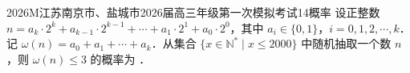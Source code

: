 
\begin{problem}{2026}{M}{江苏南京市、盐城市2026届高三年级第一次模拟考试}{14}{概率}
设正整数 $n=a_k\cdot2^k+a_{k-1}\cdot2^{k-1}+\cdots+a_1\cdot2^1+a_0\cdot2^0$，其中 $a_i\in\{0,1\}$，$i=0,1,2,\cdots,k$．记 $\omega(n)=a_0+a_1+\cdots+a_k$．从集合 $\{x\in\mathbb{N}^*\mid x\le2000\}$ 中随机抽取一个数 $n$，则 $\omega(n)\le3$ 的概率为 \underline{\hspace{4em}}．
\end{problem}